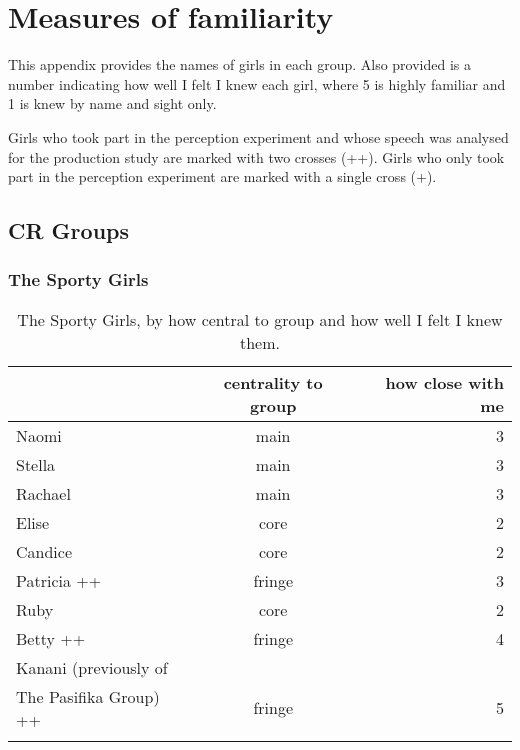%


%
\chapter{Measures of familiarity}\label{app:socialgroups}
\noindent This appendix provides the names of girls in each group.  Also provided is a number indicating how well I felt I knew each girl, where 5 is highly familiar and 1 is knew by name and sight only. 

Girls who took part in the perception experiment and whose speech was analysed for the production study are marked with two crosses (++).  Girls who only took part in the perception experiment are marked with a single cross (+).


\section{CR Groups}

\subsection{The Sporty Girls}
\nopagebreak
\begin{table}[ht]
\caption{The Sporty Girls, by how central to group and how well I felt I knew them.}\label{append:Sporty}
	\centering
		\begin{tabular}{p{4cm}cr} \\
		\lsptoprule
		\multirow{2}{*}{\sc name} & \multicolumn{1}{p{2cm}}{\centering \sc centrality to group} & \multicolumn{1}{p{1.75cm}}{\centering \sc how close with me} \\
			\midrule
Naomi   & main & 3 \\
Stella  & main & 3 \\
Rachael & main & 3 \\
Elise   & core & 2 \\
Candice & core & 2 \\  
Patricia ++ & fringe & 3 \\ 
Ruby    & core &  2 \\   
Betty  ++  & fringe & 4 \\  
Kanani (previously of\\The Pasifika Group) ++  & fringe & 5 \\
   \lspbottomrule
		\end{tabular}
\end{table}

